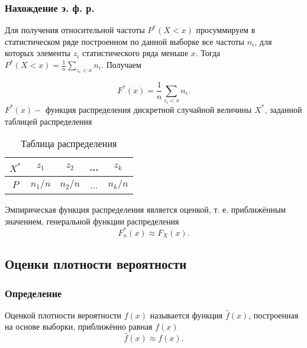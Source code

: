 \documentclass[a4paper]{article}
\begin{document}
\subsubsection{Нахождение э. ф. р.}
\noindent Для получения относительной частоты $P^*(X < x)$ просуммируем в статистическом ряде построенном по данной выборке все частоты $n_i$, для которых элементы $z_i$ статистического ряда меньше $x$. Тогда $P^*(X < x) = \frac{1}{n}\sum_{z_i<x}n_i$. Получаем   

\begin{equation} \label{empiricalFunc:EFD}
	F^*(x)=\frac{1}{n}\sum_{z_i<x}n_i.
\end{equation}
$F^*(x)-$ функция распределения дискретной случайной величины $X^*$, заданной таблицей распределения
\begin{table}[H]
	\centering
	\begin{tabular}{|c|c|c|c|c|}
		\hline
		$X^*$&$z_1$&$z_2$&...&$z_k$\\
		\hline
		$P$&$n_1/n$&$n_2/n$&...&$n_k/n$\\
		\hline
	\end{tabular}
	\caption{Таблица распределения}
	\label{tab:my_label}
\end{table}
\noindent Эмпирическая функция распределения является оценкой, т. е. приближённым значением, генеральной функции распределения
\begin{equation} \label{empiricalFunc:approx}
	F_n^*(x)\approx F_X(x).
\end{equation}


\subsection{Оценки плотности вероятности}
\subsubsection{Определение}
\noindent Оценкой плотности вероятности $f(x)$ называется функция $\widehat{f}(x)$, построенная на основе выборки, приближённо равная $f(x)$
\begin{equation} \label{densityEstim}
	\widehat{f}(x)\approx f(x).
\end{equation}
\end{document}
